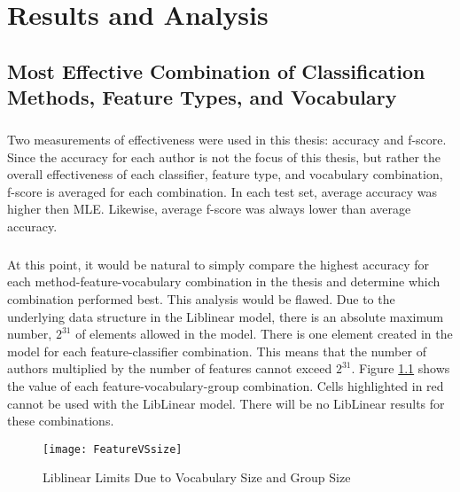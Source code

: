 \chapter{Results and Analysis}

\section{Most Effective Combination of Classification Methods, Feature Types, and Vocabulary}
	\paragraph*{} Two measurements of effectiveness were used in this thesis: accuracy and f-score.  Since the accuracy for each author is not the focus of this thesis, but rather the overall effectiveness of each classifier, feature type, and vocabulary combination, f-score is averaged for each combination.  In each test set, average accuracy was higher then MLE.  Likewise, average f-score was always lower than average accuracy.

	\paragraph*{} At this point, it would be natural to simply compare the highest accuracy for each method-feature-vocabulary combination in the thesis and determine which combination performed best.  This analysis would be flawed.  Due to the underlying data structure in the Liblinear model, there is an absolute maximum number, $2^{31}$ of elements allowed in the model.  There is one element created in the model for each feature-classifier combination.  This means that the number of authors multiplied by the number of features cannot exceed $2^{31}$.  Figure \ref{fig:FeatureVSsize} shows the value of each feature-vocabulary-group combination.  Cells highlighted in red cannot be used with the LibLinear model.  There will be no LibLinear results for these combinations.  
	
	\begin{center}
\begin{figure}[ht!]
	\centering
	\texttt{[image: FeatureVSsize]}
	\caption{Liblinear Limits Due to Vocabulary Size and Group Size}
	\label{fig:FeatureVSsize}
\end{figure}
\end{center}

